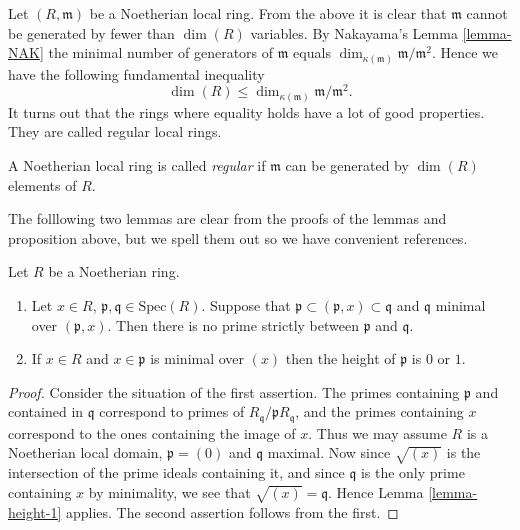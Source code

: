 \noindent
Let $(R, \mathfrak m)$ be a Noetherian local ring.
From the above it is clear that $\mathfrak m$ cannot be 
generated by fewer than $\dim(R)$ variables.
By Nakayama's Lemma \ref{lemma-NAK} the minimal number
of generators of $\mathfrak m$ equals $\dim_{\kappa(\mathfrak m)}
\mathfrak m/\mathfrak m^2$. Hence we have the following
fundamental inequality
$$
\dim(R) \leq \dim_{\kappa(\mathfrak m)} \mathfrak m/\mathfrak m^2.
$$
It turns out that the rings where equality holds
have a lot of good properties. They are called
regular local rings.

\begin{definition}
\label{definition-regular-local}
A Noetherian local ring is called {\it regular}
if $\mathfrak m$ can be generated by $\dim(R)$
elements of $R$.
\end{definition}


\noindent
The folllowing two lemmas are clear from the proofs of the
lemmas and proposition above, but we spell them out so we have
convenient references.

\begin{lemma}
\label{lemma-minimal-over-1}
Let $R$ be a Noetherian ring.
\begin{enumerate}
\item Let $x\in R$, $\mathfrak p, \mathfrak q\in \text{Spec}(R)$.
Suppose that $\mathfrak p \subset (\mathfrak p, x) \subset
\mathfrak q$ and $\mathfrak q$ minimal over $(\mathfrak p, x)$.
Then there is no prime strictly between $\mathfrak p$ and $\mathfrak q$.
\item If $x\in R$ and $x \in \mathfrak p$ is minimal over $(x)$
then the height of $\mathfrak p$ is $0$ or $1$.
\end{enumerate}
\end{lemma}

\begin{proof}
Consider the situation of the first assertion.
The primes containing $\mathfrak p$ and contained
in $\mathfrak q$ correspond to primes of
$R_{\mathfrak q}/\mathfrak pR_{\mathfrak q}$, and
the primes containing $x$ correspond to the ones containing
the image of $x$. Thus we may assume $R$ is a Noetherian local domain,
$\mathfrak p = (0)$ and $\mathfrak q$ maximal. Now since
$\sqrt{(x)}$ is the intersection of the prime ideals
containing it, and since $\mathfrak q$ is the only prime
containing $x$ by minimality, we see that $\sqrt{(x)} = \mathfrak q$.
Hence Lemma \ref{lemma-height-1} applies.
The second assertion follows from the first.
\end{proof}

